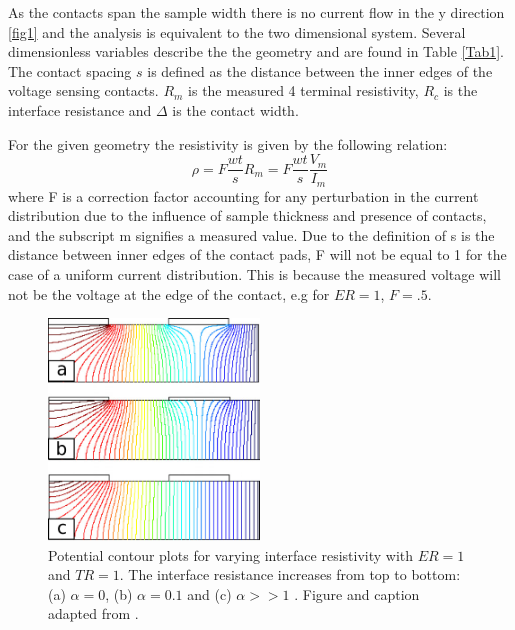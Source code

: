 As the contacts span the sample width there is no current flow in the y direction \ref{fig1} and the analysis is equivalent to the two dimensional system. Several dimensionless variables describe the the geometry and are found in Table \ref{Tab1}. The contact spacing $s$ is defined as the distance between the inner edges of the voltage sensing contacts. $R_m$ is the measured 4 terminal resistivity, $R_c$ is the interface resistance and $\Delta$ is the contact width. 

For the given geometry the resistivity is given by the following relation: \begin{equation}
    \rho   = F \frac{wt}{s}R_m = F \frac{wt}{s}\frac{V_m}{I_m}
\end{equation} where F is a correction factor accounting for any perturbation in the current distribution due to the influence of sample thickness and presence of contacts, and the subscript m signifies a measured value. Due to the definition of s is the distance between inner edges of the contact pads, F will not be equal to 1 for the case of a uniform current distribution. This is because the measured voltage will not be the voltage at the edge of the contact, e.g for $ER = 1$, $F = .5$.


 
 \begin{figure}[]
  \centering
    \includegraphics[width=0.5\textwidth]{fig/4pp/finite_contact_contour.png}
 \caption{ Potential contour plots for varying interface resistivity with $ER=1$ and $TR= 1$. The interface resistance increases from top to bottom: (a) \hspace{.5mm} $\alpha=0$, (b) \hspace{.5mm} $\alpha=0.1$ and (c) \hspace{.5mm} $\alpha>> 1$ . Figure and caption adapted from \cite{Zimney2007CorrectionStudy}.}
 \label{fig2}
\end{figure}


